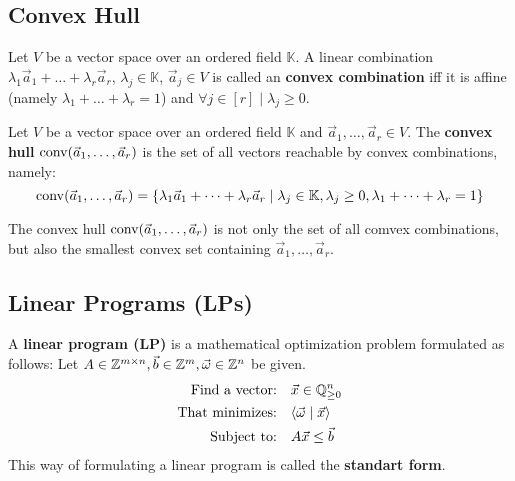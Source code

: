 \subsection{Convex Hull}
\begin{definition}
    Let $V$ be a vector space over an ordered field $\mathbb{K}$. A linear combination $\lambda_1 \vec a_1 + \dots + \lambda_r \vec a_r$, $\lambda_j \in \mathbb{K}$, $\vec a_j \in V$ is called an \textbf{convex combination} iff it is affine (namely $\lambda_1 + \dots + \lambda_r = 1$) and $\forall j\in[r]\mid \lambda_j \geq 0$.
\end{definition}
\begin{definition}
    Let $V$ be a vector space over an ordered field $\mathbb{K}$ and $\vec a_1, \dots, \vec a_r \in V$. The \textbf{convex hull} $\operatorname{conv}(\vec a_1, \dots, \vec a_r)$ is the set of all vectors reachable by convex combinations, namely:
    $$\operatorname{conv}(\vec a_1, \dots, \vec a_r) = \{\lambda_1 \vec a_1 + \dots + \lambda_r \vec a_r \mid \lambda_j \in \mathbb{K}, \lambda_j \geq 0, \lambda_1 + \dots + \lambda_r = 1\}$$
\end{definition}
\begin{observation}
    The convex hull $\operatorname{conv}(\vec a_1, \dots, \vec a_r)$ is not only the set of all comvex combinations, but also the smallest convex set containing $\vec a_1, \dots, \vec a_r$.
\end{observation}

\subsection{Linear Programs (LPs)}
\begin{definition}
    A \textbf{linear program (LP)} is a mathematical optimization problem formulated as follows: Let $A\in\mathbb{Z}^{m\times n}, \vec b \in \mathbb{Z}^m, \vec\omega \in \mathbb{Z}^n$ be given.
    \begin{align*}
        \text{Find a vector:} & \quad \vec x \in \mathbb{Q}^n_{\geq 0} \\
        \text{That minimizes:} & \quad \langle \vec \omega \mid \vec x \rangle\\
        \text{Subject to:} & \quad A\vec x \leq \vec b \\
    \end{align*}
    This way of formulating a linear program is called the \textbf{standart form}.
\end{definition}

